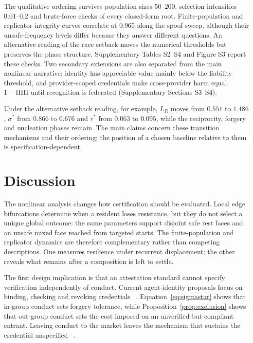 \documentclass[a4paper,fleqn,longmktitle]{cas-sc}
\theoremstyle{plain}
\theoremstyle{definition}
\begin{document}
The qualitative ordering survives population sizes $50$--$200$, selection
intensities $0.01$--$0.2$ and brute-force checks of every closed-form root.
Finite-population and replicator integrity curves correlate at $0.965$ along
the spoof sweep, although their unsafe-frequency levels differ because they
answer different questions. An alternative reading of the race setback moves
the numerical thresholds but preserves the phase structure. Supplementary
Tables S2--S4 and Figure S3 report these checks. Two secondary extensions are
also separated from the main nonlinear narrative: identity has appreciable
value mainly below the liability threshold, and provider-scoped credentials
make cross-provider harm equal $1-\mathrm{HHI}$ until recognition is federated
(Supplementary Sections S3--S4).

Under the alternative setback reading, for example, $L_R$ moves from $0.551$
to $1.486$, $\sigma^{*}$ from $0.866$ to $0.676$ and $r^{*}$ from $0.063$ to
$0.095$, while the reciprocity, forgery and nucleation phases remain. The main
claims concern these transition mechanisms and their ordering; the position
of a chosen baseline relative to them is specification-dependent.
\section{Discussion}
\label{sec:discussion}

The nonlinear analysis changes how certification should be evaluated. Local
edge bifurcations determine when a resident loses resistance, but they do not
select a unique global outcome: the same parameters support disjoint safe rest
faces and an unsafe mixed face reached from targeted starts. The
finite-population and replicator dynamics are therefore complementary rather
than competing descriptions. One measures resilience under recurrent
displacement; the other reveals what remains after a composition is left to
settle.

The first design implication is that an attestation standard cannot specify
verification independently of conduct. Current agent-identity proposals focus
on binding, checking and revoking credentials
~\citep{a2a2026spec,xu2026agentdid,grogan2025agentfacts,otsuka2026aiidentity}.
Equation~\eqref{eq:sigmastar} shows that in-group conduct sets forgery
tolerance, while Proposition~\ref{prop:exclusion} shows that out-group conduct
sets the cost imposed on an unverified but compliant entrant. Leaving conduct
to the market leaves the mechanism that sustains the credential unspecified
~\citep{hadfieldmenell2019incomplete}.
\end{document}
